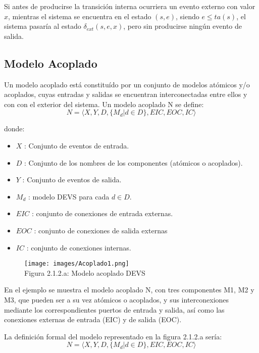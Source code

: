 Si antes de producirse la transición interna ocurriera un evento externo con valor $x$, mientras el sistema se encuentra en el estado $(s,e)$, siendo $e \leq ta(s)$, el sistema pasaría al estado $\delta_{ext}(s,e,x)$, pero sin producirse ningún evento de salida.

\subsection{Modelo Acoplado}

Un modelo acoplado está constituído por un conjunto de modelos atómicos y/o acoplados, cuyas entradas y salidas se encuentran interconectadas entre ellos y con con el exterior del sistema.
Un modelo acoplado N se define:
\begin{equation}\label{eq:DevsAcoplado}
N = \langle X,Y,D,\{M_{d}|d \in D\},EIC,EOC,IC\rangle
\end{equation}

\noindent donde:

\begin{itemize}
\item $X$ : Conjunto de eventos de entrada.	
\item $D$ : Conjunto de los nombres de los componentes (atómicos o acoplados).
\item $Y$ : Conjunto de eventos de salida.
\item $M_{d}$ : modelo DEVS para cada $d \in D$.
\item $EIC$ : conjunto de conexiones de entrada externas.
\item $EOC$ : conjunto de conexiones de salida externas
\item $IC$ : conjunto de conexiones internas.
\end{itemize}

\begin{figure}[H]
\begin{center}
\texttt{[image: images/Acoplado1.png]}
\\[0.5cm]
Figura 2.1.2.a: Modelo acoplado DEVS
\end{center}
\end{figure}

En el ejemplo se muestra el modelo acoplado N, con tres componentes M1, M2 y M3, que pueden ser a su vez atómicos o acoplados, y sus interconexiones mediante los correspondientes puertos de entrada y salida, así como las conexiones externas de entrada (EIC) y de salida (EOC).

La definición formal del modelo representado en la figura 2.1.2.a sería:
\begin{equation}\label{eq:DevsAcoplado}
N = \langle X,Y,D,\{M_{d}|d \in D\},EIC,EOC,IC\rangle
\end{equation}

